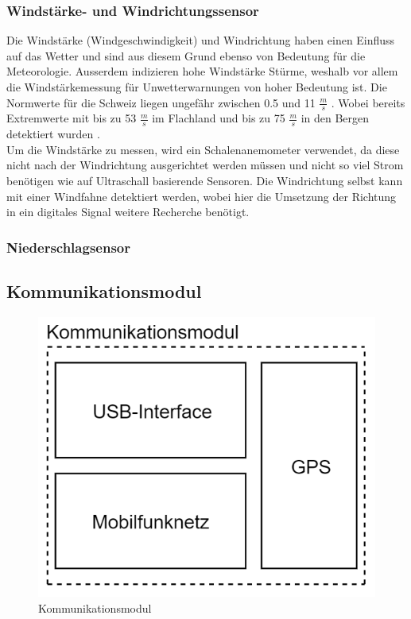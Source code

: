\subsubsection{Windstärke- und Windrichtungssensor}
Die Windstärke (Windgeschwindigkeit) und Windrichtung haben einen Einfluss auf das Wetter und sind aus diesem Grund ebenso von Bedeutung für die Meteorologie. Ausserdem indizieren hohe Windstärke Stürme, weshalb vor allem die Windstärkemessung für Unwetterwarnungen von hoher Bedeutung ist. Die Normwerte für die Schweiz liegen ungefähr zwischen 0.5 und 11 $\frac{m}{s}$ \cite{MeteoSchweizWindnorm}. Wobei bereits Extremwerte mit bis zu 53 $\frac{m}{s}$ im Flachland und bis zu 75 $\frac{m}{s}$ in den Bergen detektiert wurden \cite{MeteoSchweizExtrem}.\\
Um die Windstärke zu messen, wird ein Schalenanemometer verwendet, da diese nicht nach der Windrichtung ausgerichtet werden müssen und nicht so viel Strom benötigen wie auf Ultraschall basierende Sensoren. Die Windrichtung selbst kann mit einer Windfahne detektiert werden, wobei hier die Umsetzung der Richtung in ein digitales Signal weitere Recherche benötigt.

\subsubsection{Niederschlagsensor}

\subsection{Kommunikationsmodul}
\begin{figure}[h]
\centering
\includegraphics[scale=0.7]{graphics/Kommunikationsmodul.PNG}
\caption{Kommunikationsmodul}
\end{figure}
\newpage

